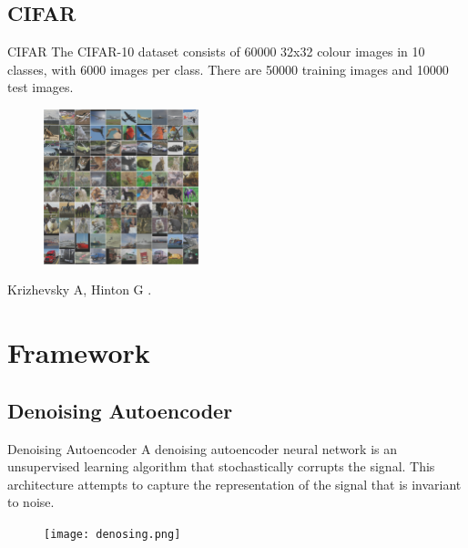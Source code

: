 \documentclass{beamer}
\begin{document}
\subsection{CIFAR}
\begin{frame}{CIFAR}
The CIFAR-10 dataset consists of 60000 32x32 colour images in 10 classes, with 6000 images per class. There are 50000 training images and 10000 test images.
    
\begin{figure}[h!]
\centering
\includegraphics[width=0.4\textwidth]{CIFAR-10.png}
\end{figure}

\begin{thebibliography}{9}
\beamertemplatebookbibitems
{}
Krizhevsky A, Hinton G
.
\end{thebibliography}

\end{frame}


\section{Framework}

\subsection{Denoising Autoencoder}
\begin{frame}{Denoising Autoencoder}
A denoising autoencoder neural network is an unsupervised learning algorithm that stochastically corrupts the signal. This architecture attempts to capture the representation of the signal that is invariant to noise.

\begin{figure}[h!]
\centering
\texttt{[image: denosing.png]}
\end{figure}

\end{frame}
\end{document}
